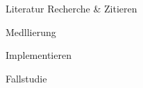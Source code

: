 


\begin{itemize*}
    \item Literatur Recherche \& Zitieren
    \item Medllierung
    \item Implementieren
    \item Fallstudie
\end{itemize*}



